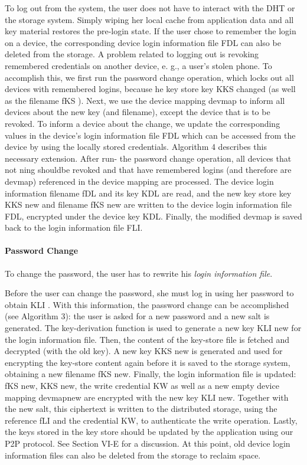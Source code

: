  To log out from the system, the user does not have to interact
with the DHT or the storage system. Simply wiping her local
cache from application data and all key material restores the
pre-login state. If the user chose to remember the login on a
device, the corresponding device login information file FDL
can also be deleted from the storage.
 A problem related to logging out is revoking remembered
credentials on another device, e. g., a user’s stolen phone. To
accomplish this, we first run the password change operation,
which locks out all devices with remembered logins, because
he key store key KKS changed (as well as the filename fKS ).
Next, we use the device mapping devmap to inform all devices
about the new key (and filename), except the device that is to
be revoked. To inform a device about the change, we update
the corresponding values in the device’s login information file
 FDL which can be accessed from the device by using the
locally stored credentials.
 Algorithm 4 describes this necessary extension. After run- the password change
operation, all devices that not ning shouldbe revoked and that have remembered
logins (and therefore are devmap) referenced in the device mapping are
processed. The device login information filename fDL and its key KDL are read,
and the new key store key KKS new and filename fKS new are written to the
device login information file FDL, encrypted under the device key KDL.
Finally, the modified devmap is saved back to the login information file FLI.
 



\paragraph{Password Change}
To change the password, the user has to rewrite his \textit{login information
file}.


Before the user can change the password, she must log in using her password to
obtain KLI . With this information, the password change can be accomplished
(see Algorithm 3): the user is asked for a new password and a new salt is
generated. The key-derivation function is used to generate a new key KLI new
for the login information file. Then, the content of the key-store file is
fetched and decrypted (with the old key). A new key KKS new is generated and
used for encrypting the key-store content again before it is saved to the
storage system, obtaining a new filename fKS new.
Finally, the login information file
is updated: fKS new, KKS new, the write credential KW as well as a new empty
device mapping devmapnew are encrypted with the new key KLI new.
  Together with the new salt, this ciphertext is written to the distributed
storage, using the reference fLI and the credential KW, to authenticate the
write operation. Lastly, the keys stored in the key store should be updated by
the application using our P2P protocol.  See Section VI-E for a discussion. At
this point, old device login information files can also be deleted from the
storage to reclaim space.

